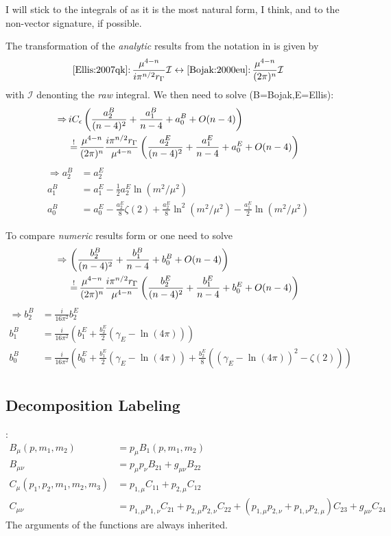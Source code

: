 I will stick to the integrals of \cite{Bojak:2000eu} as it is the most natural form, I think, and to the non-vector signature, if possible.

The transformation of the \textit{analytic} results from the notation in \cite{Ellis:2007qk} is given by
\begin{equation}
\text{\cite{Ellis:2007qk}:}\,\frac{\mu^{4-n}}{i\pi^{n/2}r_\Gamma} \mathcal{I} \leftrightarrow \text{\cite{Bojak:2000eu}:}\,\frac{\mu^{4-n}}{(2\pi)^n}\mathcal{I}
\end{equation}
with $\mathcal{I}$ denonting the \textit{raw} integral. We then need to solve (B=Bojak\cite{Bojak:2000eu},E=Ellis\cite{Ellis:2007qk}):
\begin{align}
\Rightarrow\, &iC_\epsilon\left(\frac{a_{2}^B}{(n-4)^2}+\frac{a_{1}^B}{n-4}+a_0^B + O(n-4)\right)\nonumber\\
 &\operatorname{\stackrel{!}{=}} \frac{\mu^{4-n}}{(2\pi)^n} \frac{i\pi^{n/2}r_\Gamma}{\mu^{4-n}}\left(\frac{a_{2}^E}{(n-4)^2}+\frac{a_{1}^E}{n-4}+a_0^E + O(n-4)\right)
\end{align}
\begin{align}
\Rightarrow a_{2}^B &=a_{2}^E\\
a_{1}^B &= a_{1}^E-\frac 1 2 a_{2}^E\ln(m^2/\mu^2)\\
a_0^B &= a_0^E-\frac{a_{2}^E}{8}\zeta(2)+\frac{a_{2}^E}8\ln^2(m^2/\mu^2)-\frac{a_{1}^E} 2\ln(m^2/\mu^2)
\end{align}

To compare \textit{numeric} results form \LoopTools{} or \QCDLoop{} one need to solve
\begin{align}
\Rightarrow\, &\left(\frac{b_2^B}{(n-4)^2}+\frac{b_1^B}{n-4}+b_0^B + O(n-4)\right)\nonumber\\
 &\operatorname{\stackrel{!}{=}} \frac{\mu^{4-n}}{(2\pi)^n} \frac{i\pi^{n/2}r_\Gamma}{\mu^{4-n}}\left(\frac{b_2^E}{(n-4)^2}+\frac{b_1^E}{n-4}+b_0^E + O(n-4)\right)
\end{align}
\begin{align}
\Rightarrow b_2^B &=\frac{i}{16\pi^2}b_2^E\\
b_1^B &= \frac{i}{16\pi^2}\left(b_1^E+\frac{b_2^E}2(\gamma_E-\ln(4\pi))\right)\\
b_0^B &= \frac{i}{16\pi^2}\left(b_0^E+\frac{b_1^E}2(\gamma_E-\ln(4\pi))+\frac{b_2^E}{8}\left((\gamma_E-\ln(4\pi))^2-\zeta(2)\right)\right)\\
\end{align}

\subsection{Decomposition Labeling}
\cite{Passarino:1978jh,Bojak:2000eu}:
\begin{align}
B_\mu(p,m_1,m_2) &=p_{\mu} B_1(p,m_1,m_2)\\
B_{\mu\nu} &= p_{\mu}p_{\nu} B_{21}+g_{\mu\nu}B_{22}\\
C_{\mu}(p_1,p_2,m_1,m_2,m_3) &= p_{1,\mu}C_{11}+p_{2,\mu}C_{12}\\
C_{\mu\nu} &= p_{1,\mu}p_{1,\nu}C_{21}+p_{2,\mu}p_{2,\nu}C_{22}+(p_{1,\mu}p_{2,\nu}+p_{1,\nu}p_{2,\mu})C_{23}+g_{\mu\nu}C_{24}
\end{align}
The arguments of the functions are always inherited.

